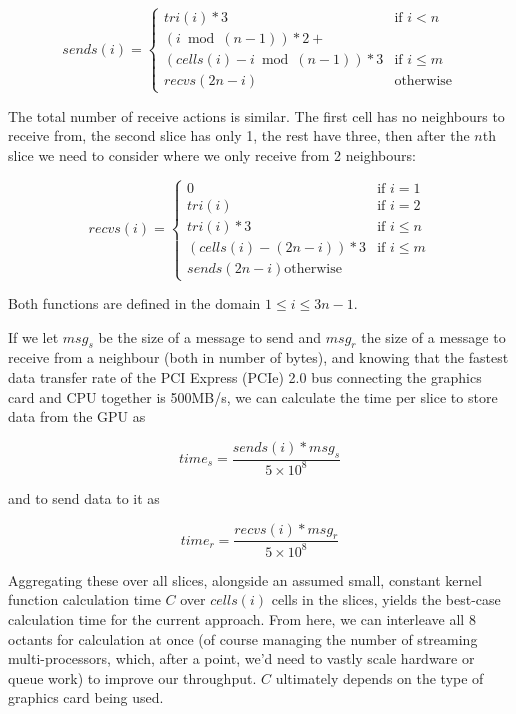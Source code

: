 \documentclass{article}
\begin{document}
\begin{equation}
sends(i) = \left\{
	\begin{array}{ll}
		tri(i) * 3 & \mbox{if } i < n \\
		(i\bmod(n - 1)) * 2 + \\
			(cells(i) - i\bmod(n - 1)) * 3 & \mbox{if } i \le m \\
		recvs(2n - i) & \mbox{otherwise}
	\end{array}
\right.
\end{equation}

The total number of receive actions is similar. The first cell has no neighbours to receive from, the second slice has only 1, the rest have three, then after the $n$th slice we need to consider where we only receive from 2 neighbours:

\begin{equation}
recvs(i) = \left\{
	\begin{array}{ll}
		0 & \mbox{if } i = 1 \\
		tri(i) & \mbox{if } i = 2 \\
		tri(i) * 3 & \mbox{if } i \le n \\
		(cells(i) - (2n - i)) * 3 & \mbox{if } i \le m \\
		sends(2n - i) \mbox{otherwise}
	\end{array}
\right.
\end{equation}

Both functions are defined in the domain $ 1 \le i \le 3n - 1 $.

If we let $ msg_s $ be the size of a message to send and $ msg_r $ the size of a message to receive from a neighbour (both in number of bytes), and knowing that the fastest data transfer rate of the PCI Express (PCIe) 2.0 bus connecting the graphics card and CPU together is 500MB/s\cite{PCIe}, we can calculate the time per slice to store data from the GPU as

\begin{equation}
time_s = \frac{sends(i) * msg_s}{5 \times 10^8}
\end{equation}

and to send data to it as

\begin{equation}
time_r = \frac{recvs(i) * msg_r}{5 \times 10^8}
\end{equation}

Aggregating these over all slices, alongside an assumed small, constant kernel function calculation time $ C $ over $ cells(i) $ cells in the slices, yields the best-case calculation time for the current approach. From here, we can interleave all 8 octants for calculation at once (of course managing the number of streaming multi-processors, which, after a point, we'd need to vastly scale hardware or queue work) to improve our throughput. $C$ ultimately depends on the type of graphics card being used.
\end{document}
